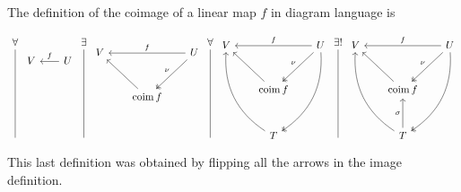 \documentclass[12pt]{amsart}
\theoremstyle{definition}
\DeclareMathOperator{\coim}{\mathrm{coim}}
\begin{document}
\begin{enumerate}
The definition of the coimage of a linear map $f$ in diagram language is

\[
    \begin{tikzcd}[row sep=1cm, column sep=.7cm]
     \forall\arrow[ddd, dash]\\
     \\
     \\
     \;
    \end{tikzcd} 
    \begin{tikzcd}[row sep=1cm, column sep=.65cm]
     V& U\arrow[l,"f"']\\
     &\\
     &
    \end{tikzcd}
    \begin{tikzcd}[row sep=1cm, column sep=.7cm]
     \exists\arrow[ddd, dash]\\
     \\
     \\
     \;
    \end{tikzcd} 
    \begin{tikzcd}[row sep=1cm, column sep=.65cm]
     V&& U\arrow[ll,"f"']\\
     &\coim f\arrow[ul]\arrow[ur, twoheadleftarrow, "\nu"]&\\ %
     & & 
    \end{tikzcd}
    \begin{tikzcd}[row sep=1cm, column sep=.7cm]
     \forall\arrow[ddd, dash,]\\
     \\
     \\
     \;
    \end{tikzcd}
    \begin{tikzcd}[row sep=1cm, column sep=.65cm]
     V&& U\arrow[ll,"f"']\\
     &\coim f\arrow[ul]\arrow[ur, twoheadleftarrow, "\nu"]&\\
     &T\arrow[uul, bend left]\arrow[uur, twoheadleftarrow, bend right]& %
    \end{tikzcd}
    \begin{tikzcd}[row sep=1cm, column sep=.7cm]
     \exists!\arrow[ddd, dash]\\
     \\
     \\
     \;
    \end{tikzcd}
    \begin{tikzcd}[row sep=1cm, column sep=.65cm]
     V&& U\arrow[ll,"f"']\\
     &\coim f\arrow[ul]\arrow[ur, twoheadleftarrow, "\nu"]&\\ 
     &T\arrow[uul, bend left]\arrow[uur, twoheadleftarrow, bend right]\arrow[u, rightarrow, "\sigma"]&
    \end{tikzcd}
    \]
    This last definition was obtained by flipping all the arrows in the image definition.\\



\end{enumerate}
\end{document}
